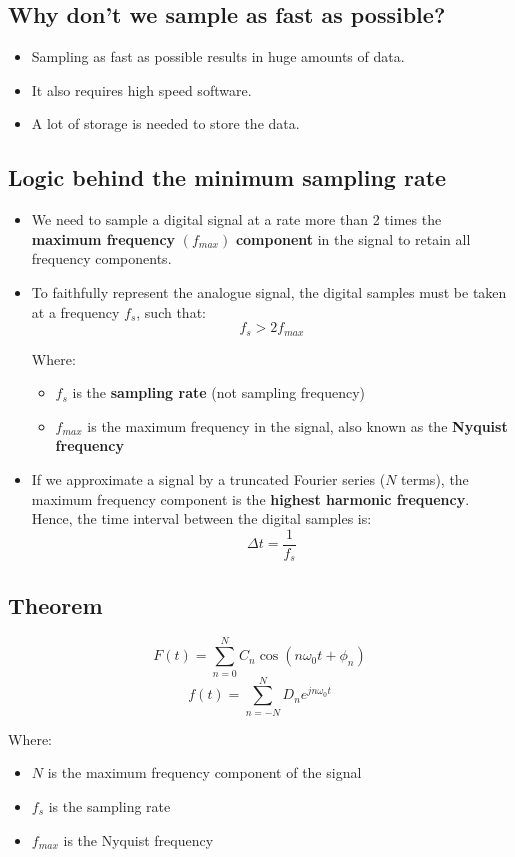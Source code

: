 \documentclass[11pt]{article}
\begin{document}
\subsection{Why don't we sample as fast as possible?}
\label{sec:orgedb3ff0}
\begin{itemize}
\item Sampling as fast as possible results in huge amounts of data.
\item It also requires high speed software.
\item A lot of storage is needed to store the data.
\end{itemize}
\subsection{Logic behind the minimum sampling rate}
\label{sec:org5902d56}
\begin{itemize}
\item We need to sample a digital signal at a rate more than 2 times the \textbf{maximum frequency} \((f_{max})\) \textbf{component} in the signal to retain all frequency components.
\item To faithfully represent the analogue signal, the digital samples must be taken at a frequency \(f_s\), such that:
\[f_s > 2 f_{max}\]

Where:
\begin{itemize}
\item \(f_s\) is the \textbf{sampling rate} (not sampling frequency)
\item \(f_{max}\) is the maximum frequency in the signal, also known as the \textbf{Nyquist frequency}
\end{itemize}

\item If we approximate a signal by a truncated Fourier series (\(N\) terms), the maximum frequency component is the \textbf{highest harmonic frequency}. Hence, the time interval between the digital samples is:
\[\Delta t = \frac{1}{f_s}\]
\end{itemize}
\subsection{Theorem}
\label{sec:orgb877f28}
\[F(t) = \sum_{n = 0}^N C_n \cos (n \omega_0 t + \phi_n)\]
\[f(t) = \sum_{n = -N}^{N} D_n e^{jn \omega_0 t}\]

Where:
\begin{itemize}
\item \(N\) is the maximum frequency component of the signal
\item \(f_s\) is the sampling rate
\item \(f_{max}\) is the Nyquist frequency
\end{itemize}
\end{document}
